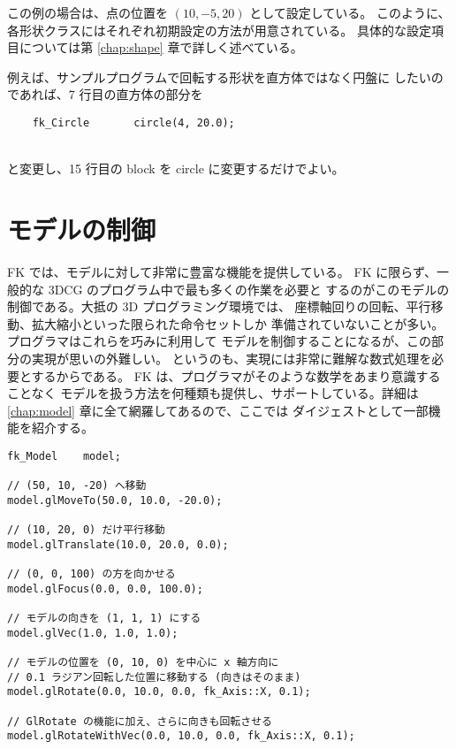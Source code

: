 この例の場合は、点の位置を \((10, -5, 20)\) として設定している。
このように、各形状クラスにはそれぞれ初期設定の方法が用意されている。
具体的な設定項目については第 \ref{chap:shape} 章で詳しく述べている。

例えば、サンプルプログラムで回転する形状を直方体ではなく円盤に
したいのであれば、7 行目の直方体の部分を
\\
\begin{screen}
\begin{verbatim}
    fk_Circle       circle(4, 20.0);
\end{verbatim}
\end{screen}
~ \\
と変更し、15 行目の block を circle に変更するだけでよい。

\section{モデルの制御}
FK では、モデルに対して非常に豊富な機能を提供している。
FK に限らず、一般的な 3DCG のプログラム中で最も多くの作業を必要と
するのがこのモデルの制御である。大抵の 3D プログラミング環境では、
座標軸回りの回転、平行移動、拡大縮小といった限られた命令セットしか
準備されていないことが多い。プログラマはこれらを巧みに利用して
モデルを制御することになるが、この部分の実現が思いの外難しい。
というのも、実現には非常に難解な数式処理を必要とするからである。
FK は、プログラマがそのような数学をあまり意識することなく
モデルを扱う方法を何種類も提供し、サポートしている。詳細は
\ref{chap:model} 章に全て網羅してあるので、ここでは
ダイジェストとして一部機能を紹介する。
\\
\begin{screen}
\begin{verbatim}
fk_Model	model;

// (50, 10, -20) へ移動
model.glMoveTo(50.0, 10.0, -20.0);

// (10, 20, 0) だけ平行移動
model.glTranslate(10.0, 20.0, 0.0);

// (0, 0, 100) の方を向かせる
model.glFocus(0.0, 0.0, 100.0);

// モデルの向きを (1, 1, 1) にする
model.glVec(1.0, 1.0, 1.0);

// モデルの位置を (0, 10, 0) を中心に x 軸方向に
// 0.1 ラジアン回転した位置に移動する (向きはそのまま)
model.glRotate(0.0, 10.0, 0.0, fk_Axis::X, 0.1);

// GlRotate の機能に加え、さらに向きも回転させる
model.glRotateWithVec(0.0, 10.0, 0.0, fk_Axis::X, 0.1);
\end{verbatim}
\end{screen}
\\

